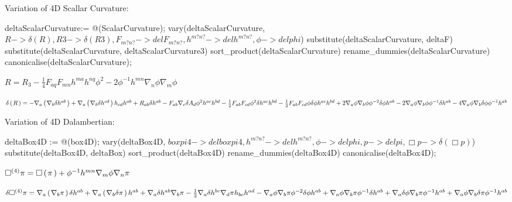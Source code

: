 \documentclass[10pt]{article}
\newcommand\brwrap[3]{%
  \setbox0=\hbox{$#2$}
  \left#1\vbox to \the\ht0{\hbox to 0pt{}}\right.\kern-.2em
  \begingroup #2\endgroup\kern-.15em
  \left.\vbox to \the\ht0{\hbox to 0pt{}}\right#3
}
\begin{document}
Variation of 4D Scallar Curvature:
\begin{python}
deltaScalarCurvature:= @(ScalarCurvature);
vary(deltaScalarCurvature, $R-> \delta(R), R3 -> \delta(R3), F_{m? n?} -> delF_{m? n?}, h^{m? n?} -> delh^{m? n?}, \phi -> delphi$)
substitute(deltaScalarCurvature, deltaF)
substitute(deltaScalarCurvature, deltaScalarCurvature3)
sort_product(deltaScalarCurvature)
rename_dummies(deltaScalarCurvature)
canonicalise(deltaScalarCurvature);
\end{python}
\begin{adjustwidth}{1em}{0cm}${}R = {R_{3}} - \frac{1}{4}F_{a q} F_{m n} h^{m a} h^{n q} {\phi}^{2}-2{\phi}^{-1} h^{m n} \nabla_{n}{\phi} \nabla_{m}{\phi}$\end{adjustwidth}
\begin{adjustwidth}{1em}{0cm}${}\delta\brwrap{(}{R}{)} = -\nabla_{a}\brwrap{(}{\nabla_{b}{\delta h^{a b}}}{)}+\nabla_{a}\brwrap{(}{\nabla_{b}{\delta h^{c d}}}{)} h_{c d} h^{a b}+R_{a b} \delta h^{a b}-F_{a b} \nabla_{c}{\delta A_{d}} {\phi}^{2} h^{a c} h^{b d} - \frac{1}{2}F_{a b} F_{c d} {\phi}^{2} \delta h^{a c} h^{b d} - \frac{1}{2}F_{a b} F_{c d} \phi \delta\phi h^{a c} h^{b d}+2\nabla_{a}{\phi} \nabla_{b}{\phi} {\phi}^{-2} \delta\phi h^{a b}-2\nabla_{a}{\phi} \nabla_{b}{\phi} {\phi}^{-1} \delta h^{a b}-4\nabla_{a}{\phi} \nabla_{b}{\delta\phi} {\phi}^{-1} h^{a b}$\end{adjustwidth}
Variation of 4D Dalambertian:
\begin{python}
deltaBox4D := @(box4D);
vary(deltaBox4D, $boxpi4 -> delboxpi4, h^{m? n?} -> delh^{m? n?}, \phi -> delphi, p -> delpi, \Box{p} -> \delta(\Box{p})$)
substitute(deltaBox4D, deltaBox)
sort_product(deltaBox4D)
rename_dummies(deltaBox4D)
canonicalise(deltaBox4D);
\end{python}
\begin{adjustwidth}{1em}{0cm}${}\Box^{(4)}{\pi} = \Box\brwrap{(}{\pi}{)}+{\phi}^{-1} h^{m n} \nabla_{m}{\phi} \nabla_{n}{\pi}$\end{adjustwidth}
\begin{adjustwidth}{1em}{0cm}${}\delta\Box^{(4)}{\pi} = \nabla_{a}\brwrap{(}{\nabla_{b}{\pi}}{)} \delta h^{a b}+\nabla_{a}\brwrap{(}{\nabla_{b}{\delta\pi}}{)} h^{a b}+\nabla_{a}{\delta h^{a b}} \nabla_{b}{\pi} - \frac{1}{2}\nabla_{a}{\delta h^{b c}} \nabla_{d}{\pi} h_{b c} h^{a d}-\nabla_{a}{\phi} \nabla_{b}{\pi} {\phi}^{-2} \delta\phi h^{a b}+\nabla_{a}{\phi} \nabla_{b}{\pi} {\phi}^{-1} \delta h^{a b}+\nabla_{a}{\delta\phi} \nabla_{b}{\pi} {\phi}^{-1} h^{a b}+\nabla_{a}{\phi} \nabla_{b}{\delta\pi} {\phi}^{-1} h^{a b}$\end{adjustwidth}
\end{document}
